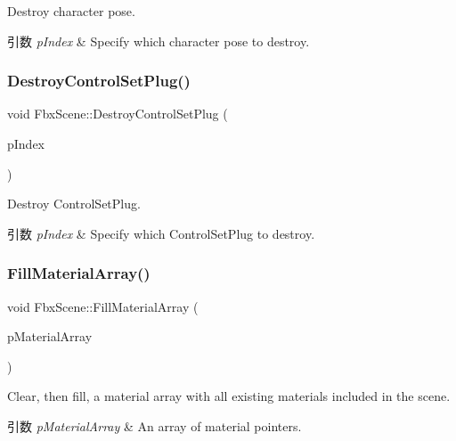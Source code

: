 Destroy character pose. 
\begin{DoxyParams}{引数}
{\em p\+Index} & Specify which character pose to destroy. \\
\hline
\end{DoxyParams}
\mbox{\label{class_fbx_scene_a7175cf4e931920126c9c051abbb5a884}} 
\subsubsection{\texorpdfstring{Destroy\+Control\+Set\+Plug()}{DestroyControlSetPlug()}}
{\footnotesize\ttfamily void Fbx\+Scene\+::\+Destroy\+Control\+Set\+Plug (\begin{DoxyParamCaption}\item[{int}]{p\+Index }\end{DoxyParamCaption})}

Destroy Control\+Set\+Plug. 
\begin{DoxyParams}{引数}
{\em p\+Index} & Specify which Control\+Set\+Plug to destroy. \\
\hline
\end{DoxyParams}
\mbox{\label{class_fbx_scene_aa70ce6e170685f3e4eec9a86ed9ead3d}} 
\subsubsection{\texorpdfstring{Fill\+Material\+Array()}{FillMaterialArray()}}
{\footnotesize\ttfamily void Fbx\+Scene\+::\+Fill\+Material\+Array (\begin{DoxyParamCaption}\item[{\hyperlink{class_fbx_array}{Fbx\+Array}$<$ \hyperlink{class_fbx_surface_material}{Fbx\+Surface\+Material} $\ast$$>$ \&}]{p\+Material\+Array }\end{DoxyParamCaption})}

Clear, then fill, a material array with all existing materials included in the scene. 
\begin{DoxyParams}{引数}
{\em p\+Material\+Array} & An array of material pointers. \\
\hline
\end{DoxyParams}
\mbox{\label{class_fbx_scene_a78c7b7beb811f9c91d98e2dec5eccedc}} 
